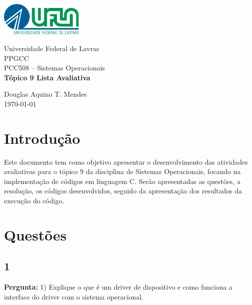 \documentclass{article}
\begin{document}
\begin{titlepage}
    \centering
    \includegraphics[width=0.3\textwidth]{../../Topic1/Avaliativo/Imagens/Logo UFLA - Colorida chapada.png}

    \vspace*{2cm} %
    \Large
    Universidade Federal de Lavras\\
    PPGCC\\
    PCC508 – Sistemas Operacionais\\
    
    \vspace{2cm} %
    \huge %
    \textbf{Tópico 9 Lista Avaliativa}

    \vfill %
    
    \large
    Douglas Aquino T. Mendes\\
    \today %
\end{titlepage}

\tableofcontents
\newpage

\section{Introdução}
Este documento tem como objetivo apresentar o desenvolvimento das atividades avaliativas para o tópico 9 da disciplina de Sistemas Operacionais, focando na implementação de códigos em linguagem C. Serão apresentadas as questões, a resolução, os códigos desenvolvidos, seguido da apresentação dos resultados da execução do código.

\section{Questões}

\subsection{1}
\textbf{Pergunta:} 1) Explique o que é um driver de dispositivo e como funciona a interface do driver com o sistema operacional.\newline
\end{document}
